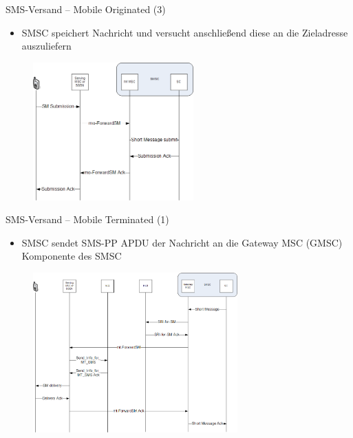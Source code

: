 \documentclass{beamer}
\begin{document}
\begin{frame}{SMS-Versand -- Mobile Originated (3)}

	\begin{itemize}
		\item SMSC speichert Nachricht und versucht anschließend diese an die 
			Zieladresse auszuliefern
	\end{itemize}
	\begin{figure}[htm]
		\includegraphics[width=0.55\textwidth]{img/mo-forward-sm-3.png}
	\end{figure}	
\end{frame}

\begin{frame}{SMS-Versand -- Mobile Terminated (1)}

	\begin{itemize}
		\item SMSC sendet SMS-PP APDU der Nachricht an die Gateway MSC (GMSC) 
			Komponente des SMSC
	\end{itemize}
	\begin{figure}[htm]
		\includegraphics[width=0.7\textwidth]{img/mt-forward-sm-1.png}
	\end{figure}
\end{frame}
\end{document}
